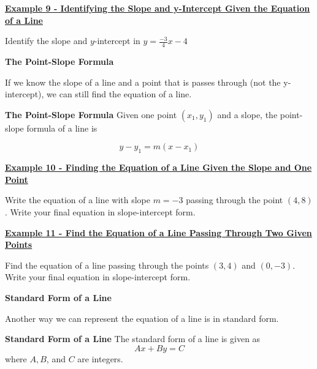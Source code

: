 \documentclass[12pt]{book}
\newcommand{\D}{\displaystyle}
\begin{document}
\vspace{60mm}
\underline{\textbf{Example 9 - Identifying the Slope and y-Intercept Given the Equation of a Line}}

\vspace{1mm}
Identify the slope and $y$-intercept in $\D y= \frac{-3}{4}x -4$

\newpage 


{\large \textbf{The Point-Slope Formula}}

If we know the slope of a line and a point that is passes through (not the y-intercept), we can still find the equation of a line.

\vspace{3mm}
\begin{boxR}
    \textbf{The Point-Slope Formula}
    \vspace{1mm}
    \hline
      \vspace{2mm}
      Given one point $(x_1,y_1)$ and a slope, the point-slope formula of a line is

      $$ y-y_1 = m(x-x_1)$$
\end{boxR}

\vspace{2mm}

\underline{\textbf{Example 10 - Finding the Equation of a Line Given the Slope and One Point}}

Write the equation of a line with slope $m=-3$ passing through the point $(4,8)$. Write your final equation in slope-intercept form.

\vspace{60mm}

\underline{\textbf{Example 11 - Find the Equation of a Line Passing Through Two Given Points}}

Find the equation of a line passing through the points $(3,4)$ and $(0,-3)$. Write your final equation in slope-intercept form.

\newpage

{\large \textbf{Standard Form of a Line}}

Another way we can represent the equation of a line is in standard form. 

\begin{boxR}
    \textbf{Standard Form of a Line}
    \vspace{1mm}
    \hline
      \vspace{2mm}
      The standard form of a line is given as
      $$ Ax + By = C $$
      where $A, B$, and $C$ are integers. 
\end{boxR}
\end{document}
